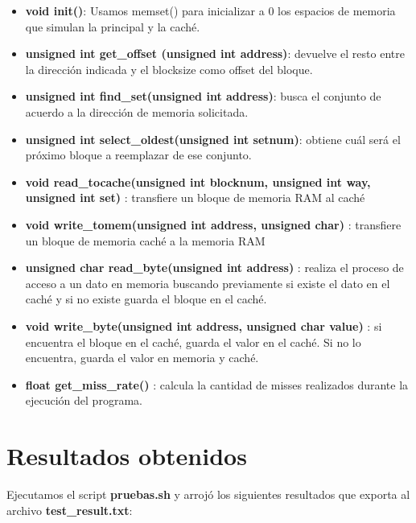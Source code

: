 \documentclass[a4paper, 10pt, twoside, notitlepage]{article}
\begin{document}
\begin{itemize}
\item[] \textbf{void init()}: Usamos memset() para inicializar a 0 los espacios de memoria que simulan la principal y la caché.
\item[] \textbf{unsigned int get\_offset (unsigned int address)}: devuelve el resto entre la dirección indicada y el blocksize como offset del bloque.
\item[] \textbf{unsigned int find\_set(unsigned int address)}: busca el conjunto de acuerdo a la dirección de memoria solicitada.
\item[] \textbf{unsigned int select\_oldest(unsigned int setnum)}: obtiene cuál será el próximo bloque a reemplazar de ese conjunto.
\item[] \textbf{void read\_tocache(unsigned int blocknum, unsigned int way, unsigned int set)} : transfiere un bloque de memoria RAM al caché
\item[] \textbf{void write\_tomem(unsigned int address, unsigned char)} : transfiere un bloque de memoria caché a la memoria RAM
\item[] \textbf{unsigned char read\_byte(unsigned int address)} : realiza el proceso de acceso a un dato en memoria buscando previamente si existe el dato en el caché y si no existe guarda el bloque en el caché.
\item[] \textbf{void write\_byte(unsigned int address, unsigned char value)} : si encuentra el bloque en el caché, guarda el valor en el caché. Si no lo encuentra, guarda el valor en memoria y caché.
\item[] \textbf{float get\_miss\_rate()} : calcula la cantidad de misses realizados durante la ejecución del programa.
\end{itemize}

\section{Resultados obtenidos}
Ejecutamos el script \textbf{pruebas.sh} y arrojó los siguientes resultados que exporta al archivo \textbf{test\_result.txt}:
\end{document}
